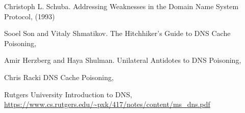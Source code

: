 \documentclass[a4paper, 12pt]{article} %
\begin{document}
%
\begin{thebibliography}{99} %

Christoph L. Schuba. 
\newblock Addressing Weaknesses in the Domain Name System Protocol,  
 (1993)

Sooel Son and Vitaly Shmatikov.
\newblock The Hitchhiker's Guide to DNS Cache Poisoning, 

Amir Herzberg and Haya Shulman.
\newblock Unilateral Antidotes to DNS Poisoning, 

Chris Racki
\newblock DNS Cache Poisoning, 

Rutgers University
\newblock Introduction to DNS,
\newblock \url{https://www.cs.rutgers.edu/~pxk/417/notes/content/ms_dns.pdf}
 
\end{thebibliography}

\end{document}
